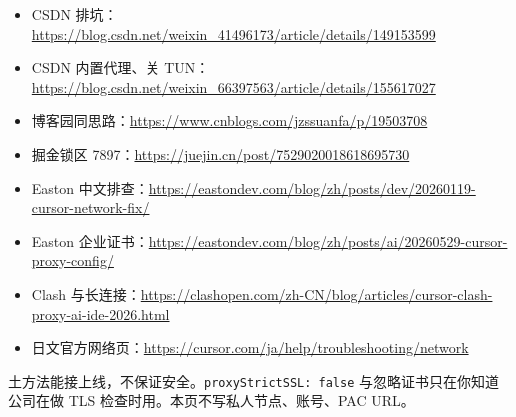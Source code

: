 \documentclass[11pt,a4paper]{ctexart}
\begin{document}
\begin{itemize}
  \item CSDN 排坑：\url{https://blog.csdn.net/weixin_41496173/article/details/149153599}
  \item CSDN 内置代理、关 TUN：\url{https://blog.csdn.net/weixin_66397563/article/details/155617027}
  \item 博客园同思路：\url{https://www.cnblogs.com/jzssuanfa/p/19503708}
  \item 掘金锁区 7897：\url{https://juejin.cn/post/7529020018618695730}
  \item Easton 中文排查：\url{https://eastondev.com/blog/zh/posts/dev/20260119-cursor-network-fix/}
  \item Easton 企业证书：\url{https://eastondev.com/blog/zh/posts/ai/20260529-cursor-proxy-config/}
  \item Clash 与长连接：\url{https://clashopen.com/zh-CN/blog/articles/cursor-clash-proxy-ai-ide-2026.html}
  \item 日文官方网络页：\url{https://cursor.com/ja/help/troubleshooting/network}
\end{itemize}

{\color{muted}\small 土方法能接上线，不保证安全。\texttt{proxyStrictSSL: false} 与忽略证书只在你知道公司在做 TLS 检查时用。本页不写私人节点、账号、PAC URL。}
\end{document}
